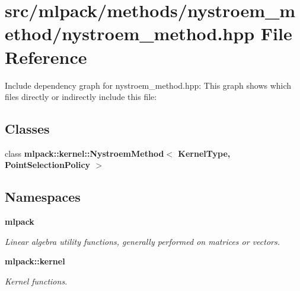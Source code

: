 \section{src/mlpack/methods/nystroem\-\_\-method/nystroem\-\_\-method.hpp File Reference}
\label{nystroem__method_2nystroem__method_8hpp}
Include dependency graph for nystroem\-\_\-method.\-hpp\-:
This graph shows which files directly or indirectly include this file\-:
\subsection*{Classes}
\begin{DoxyCompactItemize}
\item 
class {\bf mlpack\-::kernel\-::\-Nystroem\-Method$<$ Kernel\-Type, Point\-Selection\-Policy $>$}
\end{DoxyCompactItemize}
\subsection*{Namespaces}
\begin{DoxyCompactItemize}
\item 
{\bf mlpack}
\begin{DoxyCompactList}\small\item\em Linear algebra utility functions, generally performed on matrices or vectors. \end{DoxyCompactList}\item 
{\bf mlpack\-::kernel}
\begin{DoxyCompactList}\small\item\em Kernel functions. \end{DoxyCompactList}\end{DoxyCompactItemize}
